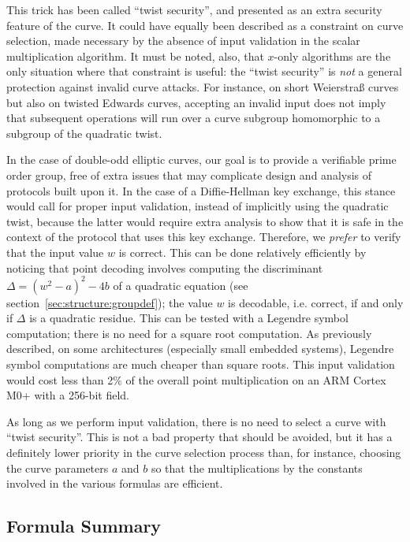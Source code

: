 \documentclass{llncs}
\begin{document}
This trick has been called ``twist security'', and presented as an extra
security feature of the curve. It could have equally been described as a
constraint on curve selection, made necessary by the absence of input
validation in the scalar multiplication algorithm. It must be noted,
also, that $x$-only algorithms are the only situation where that
constraint is useful: the ``twist security'' is \emph{not} a general
protection against invalid curve attacks. For instance, on short
Weierstraß curves but also on twisted Edwards curves, accepting an
invalid input does not imply that subsequent operations will run over a
curve subgroup homomorphic to a subgroup of the quadratic twist.

In the case of double-odd elliptic curves, our goal is to provide a
verifiable prime order group, free of extra issues that may complicate
design and analysis of protocols built upon it. In the case of
a Diffie-Hellman key exchange, this stance would call for proper input
validation, instead of implicitly using the quadratic twist, because the
latter would require extra analysis to show that it is safe in the
context of the protocol that uses this key exchange. Therefore, we
\emph{prefer} to verify that the input value $w$ is correct. This can be
done relatively efficiently by noticing that point decoding involves
computing the discriminant $\Delta = (w^2 - a)^2 - 4b$ of a quadratic
equation (see section~\ref{sec:structure:groupdef}); the value $w$ is
decodable, i.e. correct, if and only if $\Delta$ is a quadratic residue.
This can be tested with a Legendre symbol computation; there is no need
for a square root computation. As previously described, on some
architectures (especially small embedded systems), Legendre symbol
computations are much cheaper than square roots. This input validation
would cost less than 2\% of the overall point multiplication on an
ARM Cortex M0+ with a 256-bit field.

As long as we perform input validation, there is no need to select a
curve with ``twist security''. This is not a bad property that should be
avoided, but it has a definitely lower priority in the curve selection
process than, for instance, choosing the curve parameters $a$ and $b$ so
that the multiplications by the constants involved in the various
formulas are efficient.

\subsection{Formula Summary}
\end{document}
